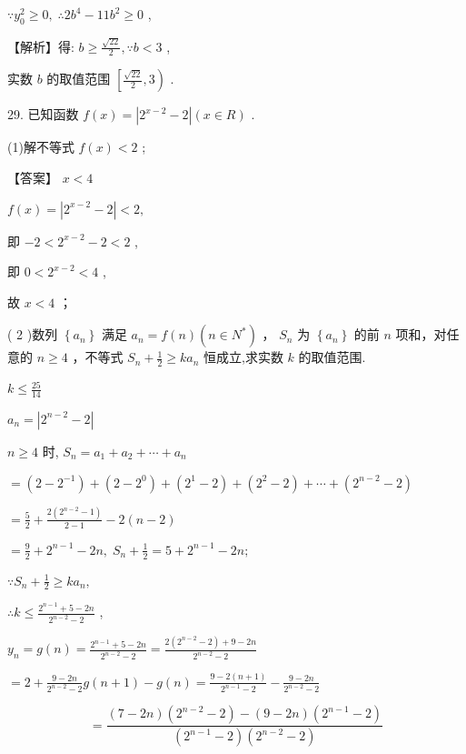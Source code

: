 \documentclass[10pt]{article}
\begin{document}
\(\because {y}_{0}^{2} \geq  0,\;\therefore 2{b}^{4} - {11}{b}^{2} \geq  0\) ,

【解析】得: \(b \geq  \frac{\sqrt{22}}{2},\because b < 3\) ,

实数 \(b\) 的取值范围 \(\left\lbrack  {\frac{\sqrt{22}}{2},3}\right)\) .

29. 已知函数 \(f\left( x\right)  = \left| {{2}^{x - 2} - 2}\right| \left( {x \in  R}\right)\) .

(1)解不等式 \(f\left( x\right)  < 2\) ;

【答案】 \(x < 4\)

\(f\left( x\right)  = \left| {{2}^{x - 2} - 2}\right|  < 2,\)

即 \(- 2 < {2}^{x - 2} - 2 < 2\) ,

即 \(0 < {2}^{x - 2} < 4\) ,

故 \(x < 4\) ；

( 2 )数列 \(\left\{  {a}_{n}\right\}\) 满足 \({a}_{n} = f\left( n\right) \left( {n \in  {N}^{ * }}\right)\) ， \({S}_{n}\) 为 \(\left\{  {a}_{n}\right\}\) 的前 \(n\) 项和，对任意的 \(n \geq  4\) ，不等式 \({S}_{n} + \frac{1}{2} \geq  k{a}_{n}\) 恒成立,求实数 \(k\) 的取值范围.

\(k \leq  \frac{25}{14}\)

\({a}_{n} = \left| {{2}^{n - 2} - 2}\right|\)

\(n \geq  4\) 时, \({S}_{n} = {a}_{1} + {a}_{2} + \cdots  + {a}_{n}\)

\(= \left( {2 - {2}^{-1}}\right)  + \left( {2 - {2}^{0}}\right)  + \left( {{2}^{1} - 2}\right)  + \left( {{2}^{2} - 2}\right)  + \cdots  + \left( {{2}^{n - 2} - 2}\right)\)

\(= \frac{5}{2} + \frac{2\left( {{2}^{n - 2} - 1}\right) }{2 - 1} - 2\left( {n - 2}\right)\)

\(= \frac{9}{2} + {2}^{n - 1} - {2n},\;{S}_{n} + \frac{1}{2} = 5 + {2}^{n - 1} - {2n};\)

\(\because {S}_{n} + \frac{1}{2} \geq  k{a}_{n},\)

\(\therefore k \leq  \frac{{2}^{n - 1} + 5 - {2n}}{{2}^{n - 2} - 2}\) ,

\({y}_{n} = g\left( n\right)  = \frac{{2}^{n - 1} + 5 - {2n}}{{2}^{n - 2} - 2} = \frac{2\left( {{2}^{n - 2} - 2}\right)  + 9 - {2n}}{{2}^{n - 2} - 2}\)

\(= 2 + \frac{9 - {2n}}{{2}^{n - 2} - 2}g\left( {n + 1}\right)  - g\left( n\right)  = \frac{9 - 2\left( {n + 1}\right) }{{2}^{n - 1} - 2} - \frac{9 - {2n}}{{2}^{n - 2} - 2}\)

\[
= \frac{\left( {7 - {2n}}\right) \left( {{2}^{n - 2} - 2}\right)  - \left( {9 - {2n}}\right) \left( {{2}^{n - 1} - 2}\right) }{\left( {{2}^{n - 1} - 2}\right) \left( {{2}^{n - 2} - 2}\right) }
\]
\end{document}

